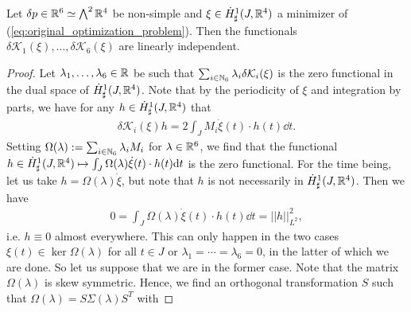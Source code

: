 \begin{proposition}
\label{prop:linearly_independent_constraints}
Let $\delta p \in \mathbb{R}^6 \simeq \bigwedge^2 \mathbb{R}^4$ be non-simple and $\xi \in \dot{H}^{1}_{\sharp}(J, \mathbb{R}^4)$ a minimizer of (\ref{eq:original_optimization_problem}). Then the functionals $\delta \mathcal{K}_1(\xi), \dotsc, \delta \mathcal{K}_6(\xi)$ are linearly independent.
\end{proposition}

\begin{proof}
Let $\lambda_1, \dotsc, \lambda_6 \in \mathbb{R}$ be such that $\sum_{i \in \mathbb{N}_6} \lambda_i \delta \mathcal{K}_i(\xi) $ is the zero functional in the dual space of $\dot{H}^{1}_{\sharp}(J, \mathbb{R}^4)$. Note that by the periodicity of $\xi$ and integration by parts, we have for any $h \in \dot{H}^{1}_{\sharp}(J, \mathbb{R}^4)$ that
\begin{align}
	\delta \mathcal{K}_i(\xi) h =  2 \int_J M_i \dot{\xi}(t) \cdot h(t) \dd t.
\end{align}
Setting $\Omega(\lambda) := \sum_{i \in \mathbb{N}_6} \lambda_i M_i$ for $\lambda \in \mathbb{R}^6$, we find that the functional $h \in \dot{H}^{1}_{\sharp}(J, \mathbb{R}^4) \mapsto \int_J \Omega(\lambda) \dot{\xi}(t) \cdot h(t) \mathrm{d}t$ is the zero functional. For the time being, let us take $h = \Omega(\lambda) \dot{\xi}$, but note that $h$ is not necessarily in $\dot{H}^{1}_{\sharp}(J, \mathbb{R}^4)$. Then we have
\begin{align}
\label{eq:zero_functional}
	0 = \int_J \Omega(\lambda) \dot{\xi}(t) \cdot h(t) \dd t = ||h||_{L^2}^{2},
\end{align}
i.e. $h \equiv 0$ almost everywhere. This can only happen in the two cases $\xi(t) \in \ker \Omega(\lambda)$ for all $t \in J$ or $\lambda_1 = \dotsm = \lambda_6 = 0$, in the latter of which we are done. So let us suppose that we are in the former case. Note that the matrix $\Omega(\lambda)$ is skew symmetric. Hence, we find an orthogonal transformation $S$ such that $\Omega(\lambda) = S \Sigma(\lambda) S^T$ with


\end{proof}
